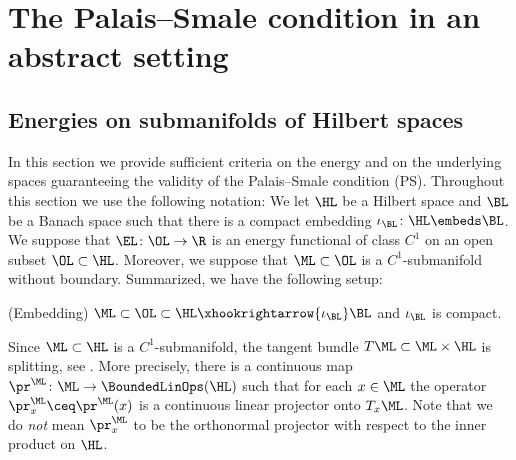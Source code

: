 
\section{The Palais--Smale condition in an abstract setting}\label{sec:PS-abstract}
\subsection{Energies on submanifolds of Hilbert spaces}
\label{sec:energies-hilbert}
In this section we provide sufficient criteria on the energy and on the underlying
spaces guaranteeing the validity of the Palais--Smale condition (PS). 
Throughout this section we use the following notation:
We let $\HL$ be a Hilbert space and $\BL$ be a Banach space such that there is a compact embedding $\iota_{\BL} \colon \HL \embeds \BL$.
We suppose that $\EL \colon \OL \to \R$ is an energy functional of class $C^1$
on an open subset $\OL \subset \HL$.
Moreover, we suppose that $\ML \subset \OL$ is a $C^1$-submanifold without boundary.
Summarized, we have the following setup:
\begin{enumerate}
	\Item[(E)]\label{condE}
	{\sc (Embedding)}
	$\ML\subset \OL\subset \HL \xhookrightarrow{\iota_\BL} \BL$ and $\iota_\BL$ is compact.
\end{enumerate}
Since $\ML \subset \HL$ is a $C^1$-submanifold, the tangent bundle $T \ML \subset \ML \times \HL$ is splitting, see \cite[Chapter III]{lang_2002}. More precisely, there is a continuous map $\pr^{\ML} \colon \ML \to \BoundedLinOps(\HL)$ such that for each $x \in \ML$ the operator $\pr^{\ML}_x \ceq \pr^{\ML}(x)$ is a continuous linear projector onto $T_x \ML$. Note that we do \emph{not} mean $\pr^{\ML}_x$ to be the orthonormal projector with respect to the inner product on $\HL$.

